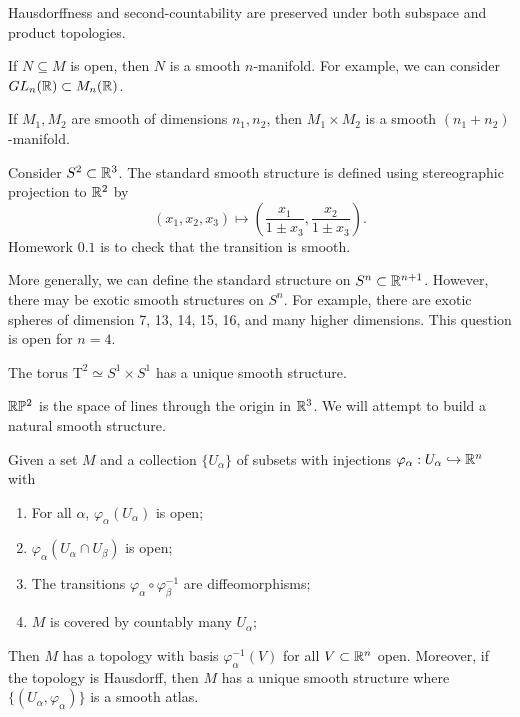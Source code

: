 \documentclass[twoside, 10pt]{article}
\begin{document}
    \begin{rmk}
        Hausdorffness and second-countability are preserved under both subspace and product topologies.
    \end{rmk}

    \begin{exm}
        If $N \subseteq M$ is open, then $N$ is a smooth $n$-manifold. For example, we can consider $GL_n(\mathbb{R}) \subset M_n(\mathbb{R})$.
    \end{exm}

    \begin{exm}
        If $M_1,M_2$ are smooth of dimensions $n_1, n_2$, then $M_1 \times M_2$ is a smooth $(n_1+n_2)$-manifold.
    \end{exm}

    \begin{exm}
        Consider $S^2 \subset \mathbb{R}^3$. The standard smooth structure is defined using stereographic projection to $\mathbb{R}^2$ by \[(x_1,x_2,x_3) \mapsto \left(\frac{x_1}{1\pm x_3}, \frac{x_2}{ 1 \pm x_3 }\right).\] Homework $0.1$ is to check that the transition is smooth.
    \end{exm}

    More generally, we can define the standard structure on $S^n \subset \mathbb{R}^{n+1}$. However, there may be exotic smooth structures on $S^n$. For example, there are exotic spheres of dimension 7, 13, 14, 15, 16, and many higher dimensions. This question is open for $n = 4$.

    \begin{exm}
        The torus $\mathrm{T}^2 \simeq S^1\times S^1$ has a unique smooth structure.
    \end{exm}

    \begin{exm}
        $\mathbb{R}\mathbb{P}^2$ is the space of lines through the origin in $\mathbb{R}^3$. We will attempt to build a natural smooth structure.
    \end{exm}

    \begin{lem}
        Given a set $M$ and a collection $\{U_{\alpha}\}$ of subsets with injections $\varphi_{\alpha}: U_{\alpha} \hookrightarrow \mathbb{R}^n$ with
        \begin{enumerate}
            \item For all $\alpha$, $\varphi_{\alpha}(U_{\alpha})$ is open;
            \item $\varphi_{\alpha}(U_{\alpha} \cap U_{\beta})$ is open;
            \item The transitions $\varphi_{\alpha} \circ \varphi_{\beta}^{-1}$ are diffeomorphisms;
            \item $M$ is covered by countably many $U_{\alpha}$;
        \end{enumerate}
        Then $M$ has a topology with basis $\varphi_{\alpha}^{-1}(V)$ for all $V \subset \mathbb{R}^n$ open. Moreover, if the topology is Hausdorff, then $M$ has a unique smooth structure where $\{(U_{\alpha}, \varphi_{\alpha})\}$ is a smooth atlas.
    \end{lem}
\end{document}
